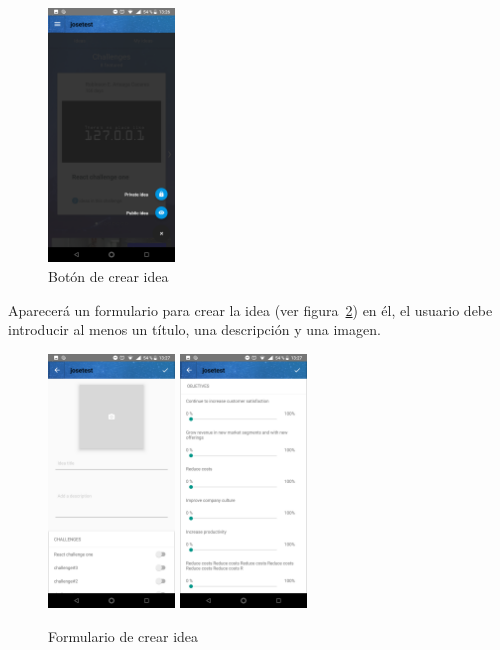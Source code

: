 \begin{figure}[!h]
	\begin{center}
		\includegraphics[width=0.3\textwidth]{./img/anexo1/inicio_crear_idea.png}
		\caption{Botón de crear idea}
		\label{fig:inicio_crear_idea}
	\end{center}
\end{figure}

Aparecerá un formulario para crear la idea (ver figura~\ref{fig:crear_idea}) en él, el usuario 
debe introducir al menos un título, una descripción y una imagen.

\begin{figure}[!h]
	\begin{center}
		\includegraphics[width=0.3\textwidth]{./img/anexo1/crear_idea.png}
		\includegraphics[width=0.3\textwidth]{./img/anexo1/crear_idea_cont.png}
		\caption{Formulario de crear idea}
		\label{fig:crear_idea}
	\end{center}
\end{figure}

